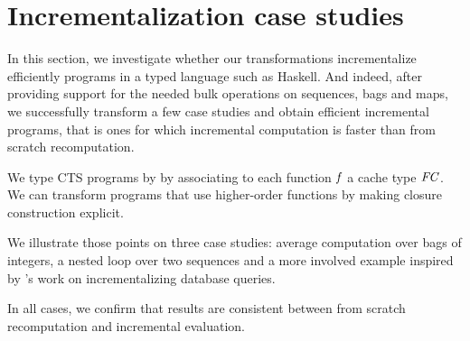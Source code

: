









\def\deriveDefCore{%
\begin{align*}
  \ensuremath{\Derive{\lambda (\Varid{x}\typcolon\sigma)\to \Varid{t}}} &= \ensuremath{\lambda (\Varid{x}\typcolon\sigma)\;(\Varid{dx}\typcolon\Delta \sigma)\to \Derive{\Varid{t}}} \\
  \ensuremath{\Derive{\Varid{s}\;\Varid{t}}} &= \ensuremath{\Derive{\Varid{s}}\;\Varid{t}\;\Derive{\Varid{t}}} \\
  \ensuremath{\Derive{\Varid{x}}} &= \ensuremath{\Varid{dx}} \\
  \ensuremath{\Derive{\Varid{c}}} &= \ensuremath{\DeriveConst{\Varid{c}}}
\end{align*}
}






\section{Incrementalization case studies}
\label{sec:case-studies}
\label{sec:cts-case-studies}

In this section, we investigate whether our transformations incrementalize
efficiently programs in a typed language such as Haskell.
And indeed, after providing support for the needed bulk operations on sequences,
bags and maps, we successfully transform a few case studies and obtain efficient
incremental programs, that is ones for which incremental computation is faster
than from scratch recomputation.

We type CTS programs by by associating to each function \ensuremath{\Varid{f}} a cache type \ensuremath{\Conid{FC}}.
We can transform programs that use higher-order functions by making closure
construction explicit.

We illustrate those points on three case studies: average computation over bags of
integers, a nested loop over two sequences and a more involved example inspired
by \citeauthor{Koch14}'s work on incrementalizing database queries.

In all cases, we confirm that results are consistent between from scratch
recomputation and incremental evaluation.


